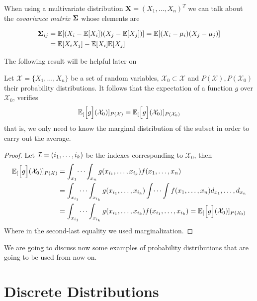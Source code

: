 When using a multivariate distribution \(\bm{X} = (X_1,\dots,X_n)^T\) we can talk about the \emph{covariance
  matrix} \(\bm{\Sigma} \) whose elements are

\[
\begin{aligned}
\bm{\Sigma}_{ij} &= \mathbb{E}[ (X_i - \mathbb{E}[X_i])
(X_j - \mathbb{E}[X_j]) ] = \mathbb{E}[(X_i - \mu_i)(X_j - \mu_j)]\\
&=\mathbb{E}[X_iX_j]-\mathbb{E}[X_i]\mathbb{E}[X_j]
\end{aligned}
\]

The following result will be helpful later on

\begin{proposition}
  Let \(\mathcal{X} = \{X_1,\dots,X_n\}\) be a set of random variables,
  \(\mathcal{X}_{0} \subset \mathcal{X}\) and \(P(\mathcal{X}), P(\mathcal{X}_{0})\)
  their probability distributions.
  It follows that the expectation of a function \(g\) over \(\mathcal{X}_0\), verifies
    \[
      \mathbb{E}_{[}\Big[g\Big](\mathcal{X}_0)]_{P(\mathcal{X})} = \mathbb{E}_{[}\Big[g\Big](\mathcal{X}_0)]_{P(\mathcal{X}_0)}
    \]
    that is, we only need to know the marginal distribution of the subset in
    order to carry out the average.
\end{proposition}

\begin{proof}
  Let \(\mathcal{I} = (i_{1}, \dots, i_{k})\) be the indexes corresponding to \(\mathcal{X}_{0}\), then
  \[
    \begin{aligned}
      \mathbb{E}_{[}\Big[g\Big](\mathcal{X}_{0})]_{P(\mathcal{X})} &= \int_{x_{1}}\dots\int_{x_{n}}g(x_{i_{1}},\dots,x_{i_{k}})f(x_{1},\dots,x_{n}) \\
      &= \int_{x_{i_{1}}}\dots\int_{x_{i_{k}}} g(x_{i_{1}},\dots,x_{i_{k}}) \int \dots \int f(x_{1},\dots,x_{n}) d_{x_{1}},\dots,d_{x_{n}}\\
      &= \int_{x_{i_{1}}}\dots\int_{x_{i_{k}}} g(x_{i_{1}},\dots,x_{i_{k}}) f(x_{i_{1}},\dots,x_{i_{k}}) =  \mathbb{E}_{[}\Big[g\Big](\mathcal{X}_{0})]_{P(\mathcal{X}_{0})} \\
      \end{aligned}
  \]
Where in the second-last equality we used marginalization.
\end{proof}

We are going to discuss now some examples of probability distributions that are
going to be used from now on.

\section{Discrete Distributions}

